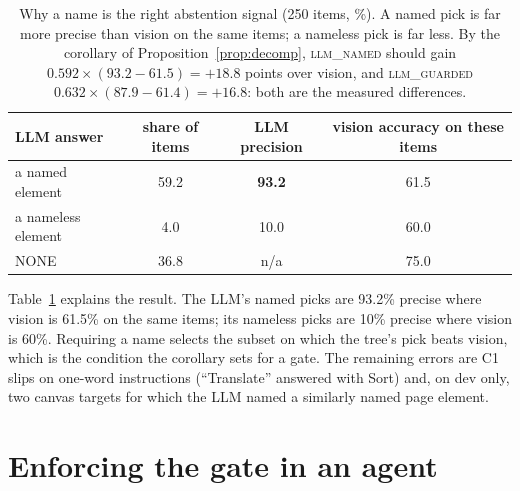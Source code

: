 \documentclass[11pt]{article}
\begin{document}
\begin{table}[t]
\centering\small
\begin{tabular}{lccc}
\toprule
LLM answer & share of items & LLM precision & vision accuracy on these items \\
\midrule
a named element & 59.2 & \textbf{93.2} & 61.5 \\
a nameless element & 4.0 & 10.0 & 60.0 \\
NONE & 36.8 & n/a & 75.0 \\
\bottomrule
\end{tabular}
\caption{Why a name is the right abstention signal (250 items, \%). A named pick is far more precise than
vision on the same items; a nameless pick is far less. By the corollary of Proposition~\ref{prop:decomp},
\textsc{llm\_named} should gain $0.592 \times (93.2 - 61.5) = +18.8$ points over vision, and
\textsc{llm\_guarded} $0.632 \times (87.9 - 61.4) = +16.8$: both are the measured differences.}
\label{tab:audit}
\end{table}

Table~\ref{tab:audit} explains the result. The LLM's named picks are 93.2\% precise where vision is 61.5\%
on the same items; its nameless picks are 10\% precise where vision is 60\%. Requiring a name selects
the subset on which the tree's pick beats vision, which is the condition the corollary sets for a gate. The remaining
errors are C1 slips on one-word instructions (``Translate'' answered with Sort) and, on dev only, two canvas
targets for which the LLM named a similarly named page element.

\section{Enforcing the gate in an agent}
\label{sec:agent}
\end{document}
